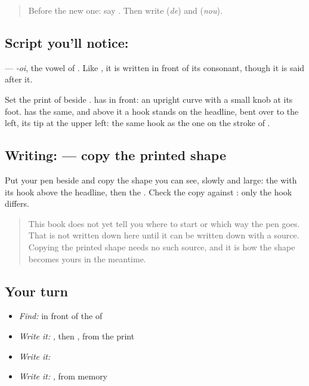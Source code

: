 \label{lesson:BN-W273-letter-oi-kar}



\begin{quote}
Before the new one: say \textbf{}. Then write \textbf{} (\emph{de}) and \textbf{} (\emph{nou}).
\end{quote}

\subsection*{Script you'll notice: }
\textbf{} — \emph{-oi}, the vowel of \textbf{}. Like \textbf{}, it is written in front of its consonant, though it is said after it.

Set the print of \textbf{} beside \textbf{}. \textbf{} has \textbf{} in front: an upright curve with a small knob at its foot. \textbf{} has the same, and above it a hook stands on the headline, bent over to the left, its tip at the upper left: the same hook as the one on the stroke of \textbf{}.

\subsection*{Writing:  — copy the printed shape}
Put your pen beside \textbf{} and copy the shape you can see, slowly and large: the \textbf{} with its hook above the headline, then the \textbf{}. Check the copy against \textbf{}: only the hook differs.

\begin{quote}
This book does not yet tell you where to start  or which way the pen goes. That is not written down here until it can be written down with a source. Copying the printed shape needs no such source, and it is how the shape becomes yours in the meantime.
\end{quote}

\subsection*{Your turn}
\begin{itemize}
\raggedright
  \item \emph{Find:}  in front of the  of \textbf{}
  \item \emph{Write it:} \textbf{}, then \textbf{}, from the print
  \item \emph{Write it:} \textbf{}
  \item \emph{Write it:} \textbf{}, from memory
\end{itemize}


